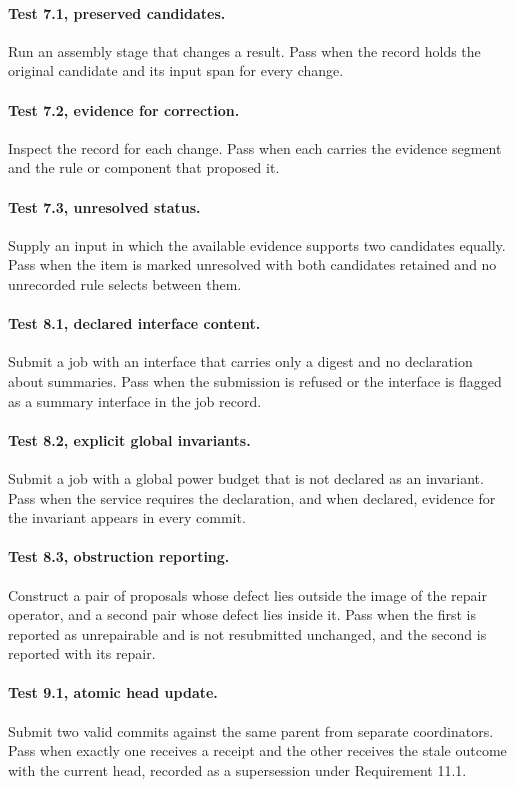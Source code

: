 \documentclass[11pt,openany]{book}
\theoremstyle{remark}
\begin{document}
\paragraph{Test 7.1, preserved candidates.} Run an assembly stage that changes a result. Pass when the record holds the original candidate and its input span for every change.

\paragraph{Test 7.2, evidence for correction.} Inspect the record for each change. Pass when each carries the evidence segment and the rule or component that proposed it.

\paragraph{Test 7.3, unresolved status.} Supply an input in which the available evidence supports two candidates equally. Pass when the item is marked unresolved with both candidates retained and no unrecorded rule selects between them.

\paragraph{Test 8.1, declared interface content.} Submit a job with an interface that carries only a digest and no declaration about summaries. Pass when the submission is refused or the interface is flagged as a summary interface in the job record.

\paragraph{Test 8.2, explicit global invariants.} Submit a job with a global power budget that is not declared as an invariant. Pass when the service requires the declaration, and when declared, evidence for the invariant appears in every commit.

\paragraph{Test 8.3, obstruction reporting.} Construct a pair of proposals whose defect lies outside the image of the repair operator, and a second pair whose defect lies inside it. Pass when the first is reported as unrepairable and is not resubmitted unchanged, and the second is reported with its repair.

\paragraph{Test 9.1, atomic head update.} Submit two valid commits against the same parent from separate coordinators. Pass when exactly one receives a receipt and the other receives the stale outcome with the current head, recorded as a supersession under Requirement 11.1.
\end{document}
